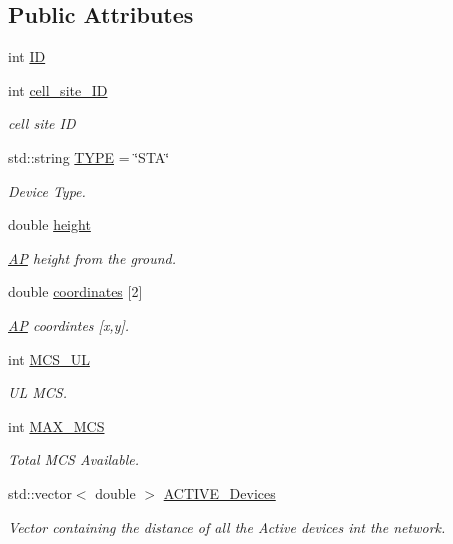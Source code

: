 \subsection*{Public Attributes}
\begin{DoxyCompactItemize}
\item 
int \hyperlink{classSTA_a9376abb50969b5b16aeb5fb0e449e6f7}{I\-D}
\item 
int \hyperlink{classSTA_a434bab00c391cd259abd7582cace24a1}{cell\-\_\-site\-\_\-\-I\-D}
\begin{DoxyCompactList}\small\item\em cell site I\-D \end{DoxyCompactList}\item 
std\-::string \hyperlink{classSTA_a4ddff6315fc6fa20fd508a24dbe54a7d}{T\-Y\-P\-E} = \char`\"{}S\-T\-A\char`\"{}
\begin{DoxyCompactList}\small\item\em Device Type. \end{DoxyCompactList}\item 
double \hyperlink{classSTA_a85ba9b72f68ceeef8c89f02806c71890}{height}
\begin{DoxyCompactList}\small\item\em \hyperlink{classAP}{A\-P} height from the ground. \end{DoxyCompactList}\item 
double \hyperlink{classSTA_aba57e1e65b70a3b6f556495e47f6838a}{coordinates} \mbox{[}2\mbox{]}
\begin{DoxyCompactList}\small\item\em \hyperlink{classAP}{A\-P} coordintes \mbox{[}x,y\mbox{]}. \end{DoxyCompactList}\item 
int \hyperlink{classSTA_a21e0611dde6754144f220cc7312d5909}{M\-C\-S\-\_\-\-U\-L}
\begin{DoxyCompactList}\small\item\em U\-L M\-C\-S. \end{DoxyCompactList}\item 
int \hyperlink{classSTA_a5c5df3db89aa13fc409c4c0d6f8924d2}{M\-A\-X\-\_\-\-M\-C\-S}
\begin{DoxyCompactList}\small\item\em Total M\-C\-S Available. \end{DoxyCompactList}\item 
std\-::vector$<$ double $>$ \hyperlink{classSTA_a536179d10f961ae6f7330b980a13668e}{A\-C\-T\-I\-V\-E\-\_\-\-Devices}
\begin{DoxyCompactList}\small\item\em Vector containing the distance of all the Active devices int the network. \end{DoxyCompactList}\item 

\end{DoxyCompactItemize}
